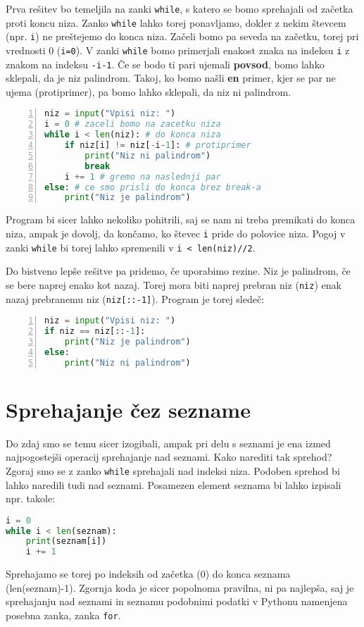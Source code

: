 \begin{resitev}
Prva rešitev bo temeljila na zanki \texttt{while}, s katero se bomo sprehajali od začetka proti koncu niza. Zanko \texttt{while} lahko torej ponavljamo, dokler z nekim števcem (npr. \texttt{i}) ne preštejemo do konca niza. Začeli bomo pa seveda na začetku, torej pri vrednosti 0 (\texttt{i=0}). V zanki \texttt{while} bomo primerjali enakost znaka na indeksu \texttt{i} z znakom na indeksu \texttt{-i-1}. Če se bodo ti pari ujemali \textbf{povsod}, bomo lahko sklepali, da je niz palindrom. Takoj, ko bomo našli \textbf{en} primer, kjer se par ne ujema (protiprimer), pa bomo lahko sklepali, da niz ni palindrom.
\begin{lstlisting}[language=Python,numbers=left]
niz = input("Vpisi niz: ")
i = 0 # zaceli bomo na zacetku niza
while i < len(niz): # do konca niza
    if niz[i] != niz[-i-1]: # protiprimer
        print("Niz ni palindrom")
        break
    i += 1 # gremo na naslednji par
else: # ce smo prisli do konca brez break-a
    print("Niz je palindrom")
\end{lstlisting}
Program bi sicer lahko nekoliko pohitrili, saj se nam ni treba premikati do konca niza, ampak je dovolj, da končamo, ko števec \texttt{i} pride do polovice niza. Pogoj v zanki \texttt{while} bi torej lahko spremenili v \texttt{i < len(niz)//2}.

Do bistveno lepše rešitve pa pridemo, če uporabimo rezine. Niz je palindrom, če se bere naprej enako kot nazaj. Torej mora biti naprej prebran niz (\texttt{niz}) enak nazaj prebranemu niz (\texttt{niz[::-1]}). Program je torej sledeč:
\begin{lstlisting}[language=Python,numbers=left]
niz = input("Vpisi niz: ")
if niz == niz[::-1]:
    print("Niz je palindrom")
else:
    print("Niz ni palindrom")
\end{lstlisting}
\end{resitev}

\section{Sprehajanje čez sezname}
Do zdaj smo se temu sicer izogibali, ampak pri delu s seznami je ena izmed najpogostejši operacij sprehajanje nad seznami. Kako narediti tak sprehod? Zgoraj smo se z zanko \texttt{while} sprehajali nad indeksi niza. Podoben sprehod bi lahko naredili tudi nad seznami. Posamezen element seznama bi lahko izpisali npr. takole:
\begin{lstlisting}[language=Python]
i = 0
while i < len(seznam):
    print(seznam[i])
    i += 1
\end{lstlisting}
Sprehajamo se torej po indeksih od začetka (0) do konca seznama (len(seznam)-1). Zgornja koda je sicer popolnoma pravilna, ni pa najlepša, saj je sprehajanju nad seznami in seznamu podobnimi podatki v Pythonu namenjena posebna zanka, zanka \texttt{for}.